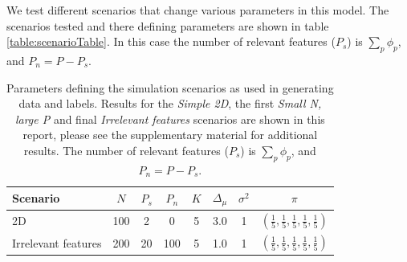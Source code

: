 \documentclass{bioinfo}
\begin{document}
We test different scenarios that change various parameters in this model. The scenarios tested and there defining parameters are shown in table \ref{table:scenarioTable}. In this case the number of relevant features (\(P_s\)) is $\sum_p \phi_p$, and $P_n = P - P_s$.

\begin{table}[ht]
	\centering
	\caption{Parameters defining the simulation scenarios as used in generating data and labels. Results for the \emph{Simple 2D}, the first \emph{Small N, large P} and final \emph{Irrelevant features} scenarios are shown in this report, please see the supplementary material for additional results. The number of relevant features (\(P_s\)) is $\sum_p \phi_p$, and $P_n = P - P_s$.}
	\begin{tabular}{l|ccccccc}
		\toprule
		\textbf{Scenario} & $N$ & $P_s$ & $P_n$ & $K$ & $\Delta_{\mu}$ & $\sigma^2$ & $\pi$\\
		\midrule
		2D & 100 & 2 & 0 & 5 & 3.0 & 1 &  $(\frac{1}{5} , \frac{1}{5}, \frac{1}{5}, \frac{1}{5}, \frac{1}{5})$ \\
		Irrelevant features & 200 & 20 & 100 & 5 & 1.0 & 1 &  $(\frac{1}{5} , \frac{1}{5}, \frac{1}{5}, \frac{1}{5}, \frac{1}{5})$\\

\end{tabular}
\end{table}
\end{document}
